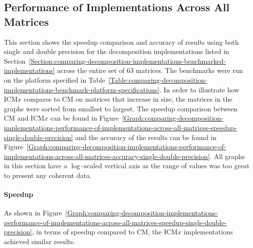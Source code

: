\subsection{Performance of Implementations Across All Matrices \TO}\label{Subsection:comparing-decomposition-implementations-performance-of-implementations-across-all-matrices}
This section shows the speedup comparison and accuracy of results using both single and double precision for the decomposition implementations listed in Section~\ref{Section:comparing-decomposition-implementations-benchmarked-implementations} across the entire set of 63 matrices. The benchmarks were run on the platform specified in Table~\ref{Table:comparing-decomposition-implementations-benchmark-platform-specifications}. In order to illustrate how ICM$ x $ compares to CM on matrices that increase in size, the matrices in the graphs were sorted from smallest to largest. The speedup comparison between CM and ICM$ x $ can be found in Figure~\ref{Graph:comparing-decomposition-implementations-performance-of-implementations-across-all-matrices-speedup-single-double-precision} and the accuracy of the results can be found in Figure~\ref{Graph:comparing-decomposition-implementations-performance-of-implementations-across-all-matrices-accuracy-single-double-precision}. All graphs in this section have a $ \log $-scaled vertical axis as the range of values was too great to present any coherent data.

\paragraph{Speedup} As shown in Figure~\ref{Graph:comparing-decomposition-implementations-performance-of-implementations-across-all-matrices-speedup-single-double-precision}, in terms of speedup compared to CM, the ICM$ x $ implementations achieved similar results.

